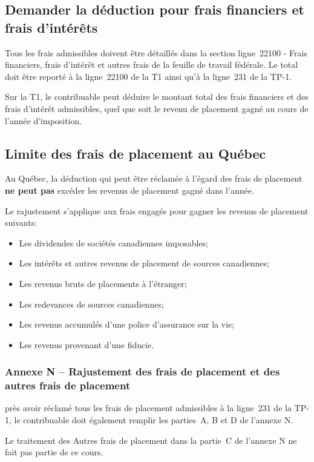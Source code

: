 \subsection{Demander la déduction pour frais financiers et frais d'intérêts}
Tous les frais admissibles doivent être détaillés dans la section \og ligne~22100 - Frais financiers, frais d'intérêt et autres frais \fg{} de la feuille de travail fédérale. Le total doit être reporté à la ligne~22100 de la T1 ainsi qu'à la ligne~231 de la TP-1.

Sur la T1, le contribuable peut déduire le montant total des frais financiers et des frais d'intérêt admissibles, quel que soit le revenu de placement gagné au cours de l'année d'imposition.


\subsection{Limite des frais de placement au Québec}
Au Québec, la déduction qui peut être réclamée à l'égard des frais de placement \textbf{ne peut pas} excéder les revenus de placement gagné dans l'année. 

Le rajustement s'applique aux frais engagés pour gagner les revenus de placement suivants:
\begin{itemize}
	\item Les dividendes de sociétés canadiennes imposables;
	\item Les intérêts et autres revenus de placement de sources canadiennes;
	\item Les revenus bruts de placements à l'étranger;
	\item Les redevances de sources canadiennes;
	\item Les revenus accumulés d'une police d'assurance sur la vie;
	\item Les revenus provenant d'une fiducie.
\end{itemize}

\subsubsection{Annexe N -- Rajustement des frais de placement et des autres frais de placement}
près avoir réclamé tous les frais de placement admissibles à la ligne~231 de la TP-1, le contribuable doit également remplir les parties~A, B et D de l'annexe N.

Le traitement des \og Autres frais de placement \fg{} dans la partie~C de l'annexe N ne fait pas partie de ce cours.

